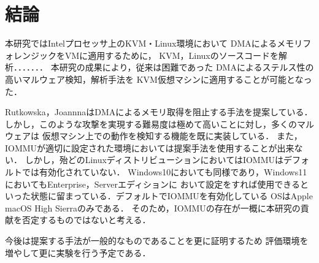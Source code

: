 \chapter{結論}
\label{chap:conclustion}


本研究ではIntelプロセッサ上のKVM・Linux環境において
DMAによるメモリフォレンジックをVMに適用するために，
KVM，Linuxのソースコードを解析．．．．．．．
本研究の成果により，従来は困難であった
DMAによるステルス性の高いマルウェア検知，解析手法を
KVM仮想マシンに適用することが可能となった．

Rutkowska，JoannnaはDMAによるメモリ取得を阻止する手法を提案している\cite{beyond_the_cpu}．
しかし，このような攻撃を実現する難易度は極めて高いことに対し，多くのマルウェアは
仮想マシン上での動作を検知する機能を既に実装している\cite{linux_malware}．
また，IOMMUが適切に設定された環境においては提案手法を使用することが出来ない．
しかし，殆どのLinuxディストリビューションにおいてはIOMMUはデフォルトでは有効化されていない．
Windows10においても同様であり\cite{win10iommu}，Windows11においてもEnterprise，Serverエディションに
おいて設定をすれば使用できるといった状態に留まっている．デフォルトでIOMMUを有効化している
OSはApple macOS High Sierraのみである．
そのため，IOMMUの存在が一概に本研究の貢献を否定するものではないと考える．

今後は提案する手法が一般的なものであることを更に証明するため
評価環境を増やして更に実験を行う予定である．


